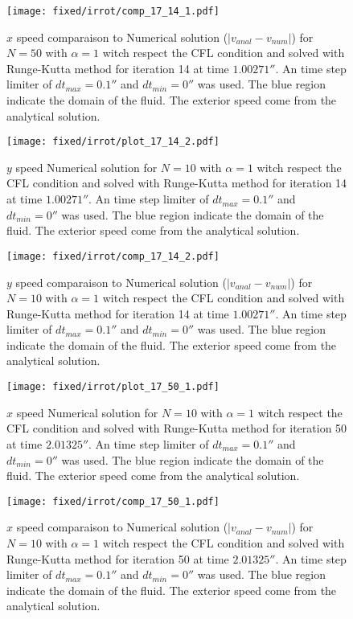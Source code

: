 \begin{figure}
\texttt{[image: fixed/irrot/comp\_17\_14\_1.pdf]}
\caption{$x$ speed comparaison to Numerical solution ($|v_{anal}-v_{num}|$) for $N=50$ with $\alpha=1$ witch respect the CFL condition and solved with Runge-Kutta method
for iteration 14 at time $\unit{1.00271}{\second}$.
An time step limiter of $dt_{max}=\unit{0.1}{\second}$ and $dt_{min}=\unit{0}{\second}$ was used.
The blue region indicate the domain of the fluid. The exterior speed come from the analytical solution.
\label{fix:comp_17_14_1}
}
\end{figure}

\begin{figure}
\texttt{[image: fixed/irrot/plot\_17\_14\_2.pdf]}
\caption{$y$ speed Numerical solution for $N=10$ with $\alpha=1$ witch respect the CFL condition and solved with Runge-Kutta method
for iteration 14 at time $\unit{1.00271}{\second}$.
An time step limiter of $dt_{max}=\unit{0.1}{\second}$ and $dt_{min}=\unit{0}{\second}$ was used.
The blue region indicate the domain of the fluid. The exterior speed come from the analytical solution.
\label{fix:plot_17_14_2}
}
\end{figure}

\begin{figure}
\texttt{[image: fixed/irrot/comp\_17\_14\_2.pdf]}
\caption{$y$ speed comparaison to Numerical solution ($|v_{anal}-v_{num}|$) for $N=10$ with $\alpha=1$ witch respect the CFL condition and solved with Runge-Kutta method
for iteration 14 at time $\unit{1.00271}{\second}$.
An time step limiter of $dt_{max}=\unit{0.1}{\second}$ and $dt_{min}=\unit{0}{\second}$ was used.
The blue region indicate the domain of the fluid. The exterior speed come from the analytical solution.
\label{fix:comp_17_14_2}
}
\end{figure}

\begin{figure}
\texttt{[image: fixed/irrot/plot\_17\_50\_1.pdf]}
\caption{$x$ speed Numerical solution for $N=10$ with $\alpha=1$ witch respect the CFL condition and solved with Runge-Kutta method
for iteration 50 at time $\unit{2.01325}{\second}$.
An time step limiter of $dt_{max}=\unit{0.1}{\second}$ and $dt_{min}=\unit{0}{\second}$ was used.
The blue region indicate the domain of the fluid. The exterior speed come from the analytical solution.
\label{fix:plot_17_50_1}
}
\end{figure}

\begin{figure}
\texttt{[image: fixed/irrot/comp\_17\_50\_1.pdf]}
\caption{$x$ speed comparaison to Numerical solution ($|v_{anal}-v_{num}|$) for $N=10$ with $\alpha=1$ witch respect the CFL condition and solved with Runge-Kutta method
for iteration 50 at time $\unit{2.01325}{\second}$.
An time step limiter of $dt_{max}=\unit{0.1}{\second}$ and $dt_{min}=\unit{0}{\second}$ was used.
The blue region indicate the domain of the fluid. The exterior speed come from the analytical solution.
\label{fix:comp_17_50_1}
}
\end{figure}

